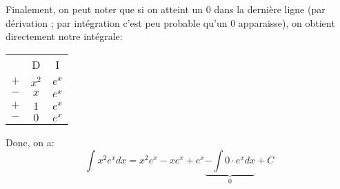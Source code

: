 \documentclass[a4paper]{article}
\begin{document}
{{        Finalement, on peut noter que si on atteint un 0 dans la dernière ligne (par dérivation ; par intégration c'est peu probable qu'un 0 apparaisse), on obtient directement notre intégrale:
        \begin{center}
            \begin{tabular}{ccc}
                    & D                   & I                   \\
                $+$ & $\displaystyle x^2$ & $\displaystyle e^x$ \\
                $-$ & $\displaystyle x$   & $\displaystyle e^x$ \\
                $+$ & $\displaystyle 1$   & $\displaystyle e^x$ \\
                $-$ & $\displaystyle 0$   & $\displaystyle e^x$
            \end{tabular}
        \end{center}

        Donc, on a:
        \[\int x^2 e^x dx = x^2 e^x - xe^x + e^x \underbrace{- \int0\cdot e^x dx}_{0} + C\]

    }
}
\end{document}
